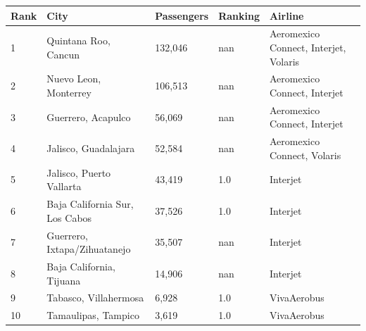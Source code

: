 \documentclass{article}
\begin{document}
\begin{tabular}{lllll}
\toprule
Rank & City & Passengers & Ranking & Airline \\
\midrule
1 & Quintana Roo, Cancun & 132,046 & nan & Aeromexico Connect, Interjet, Volaris \\
2 & Nuevo Leon, Monterrey & 106,513 & nan & Aeromexico Connect, Interjet \\
3 & Guerrero, Acapulco & 56,069 & nan & Aeromexico Connect, Interjet \\
4 & Jalisco, Guadalajara & 52,584 & nan & Aeromexico Connect, Volaris \\
5 & Jalisco, Puerto Vallarta & 43,419 & 1.0 & Interjet \\
6 & Baja California Sur, Los Cabos & 37,526 & 1.0 & Interjet \\
7 & Guerrero, Ixtapa/Zihuatanejo & 35,507 & nan & Interjet \\
8 & Baja California, Tijuana & 14,906 & nan & Interjet \\
9 & Tabasco, Villahermosa & 6,928 & 1.0 & VivaAerobus \\
10 & Tamaulipas, Tampico & 3,619 & 1.0 & VivaAerobus \\
\bottomrule
\end{tabular}
\end{document}
